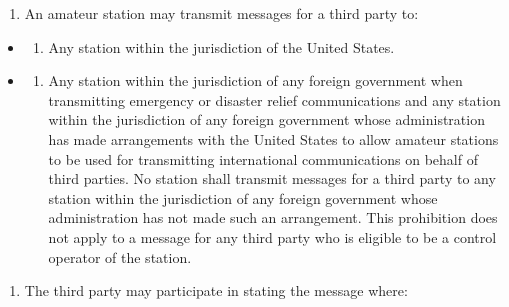 \documentclass[
  letterpaper,
  DIV=11,
  numbers=noendperiod]{scrreport}
\providecommand{\tightlist}{%
  \setlength{\itemsep}{0pt}\setlength{\parskip}{0pt}}\usepackage{longtable,booktabs,array}
\begin{document}
\begin{enumerate}
\def\labelenumi{(\alph{enumi})}
\tightlist
\item
  An amateur station may transmit messages for a third party to:
\end{enumerate}

\begin{itemize}
\item
  \begin{enumerate}
  \def\labelenumi{(\arabic{enumi})}
  \tightlist
  \item
    Any station within the jurisdiction of the United States.
  \end{enumerate}
\item
  \begin{enumerate}
  \def\labelenumi{(\arabic{enumi})}
  \setcounter{enumi}{1}
  \tightlist
  \item
    Any station within the jurisdiction of any foreign government when
    transmitting emergency or disaster relief communications and any
    station within the jurisdiction of any foreign government whose
    administration has made arrangements with the United States to allow
    amateur stations to be used for transmitting international
    communications on behalf of third parties. No station shall transmit
    messages for a third party to any station within the jurisdiction of
    any foreign government whose administration has not made such an
    arrangement. This prohibition does not apply to a message for any
    third party who is eligible to be a control operator of the station.
  \end{enumerate}
\end{itemize}

\begin{enumerate}
\def\labelenumi{(\alph{enumi})}
\setcounter{enumi}{1}
\tightlist
\item
  The third party may participate in stating the message where:
\end{enumerate}
\end{document}
